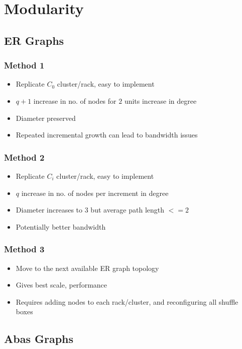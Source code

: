 \section{Modularity}

\subsection{ER Graphs}

\subsubsection{Method 1}
    \begin{itemize}
        \item  Replicate $C_0$ cluster/rack, easy to implement
        \item  $q+1$ increase in no. of nodes for $2$ units increase in degree
        \item  Diameter preserved
        \item  Repeated incremental growth can lead to bandwidth issues
    \end{itemize}

\subsubsection{Method 2}
    \begin{itemize}
        \item  Replicate $C_i$ cluster/rack, easy to implement
        \item  $q$ increase in no. of nodes per increment in degree
        \item  Diameter increases to $3$ but average path length $<=2$
        \item  Potentially better bandwidth
    \end{itemize}

\subsubsection{Method 3}
    \begin{itemize}
        \item Move to the next available ER graph topology
        \item Gives best scale, performance
        \item Requires adding nodes to each rack/cluster, and reconfiguring all 
              shuffle boxes
    \end{itemize}


\subsection{Abas Graphs}
       

